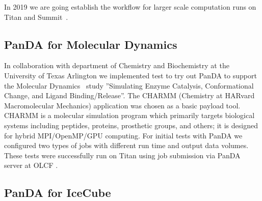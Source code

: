 \documentclass{webofc}
\begin{document}
In 2019 we are going establish the workflow for larger scale computation runs on Titan and Summit~\cite{Summit}.

\subsection{PanDA for Molecular Dynamics} \label{section_moldyn}

In collaboration with department of Chemistry and Biochemistry at the University of Texas Arlington we implemented test to try out PanDA to support the Molecular Dynamics~\cite{3b6dad414e794d36954333f8f177f47c} study ''Simulating Enzyme Catalysis, Conformational Change, and Ligand Binding/Release''. 
The CHARMM (Chemistry at HARvard Macromolecular Mechanics) application was chosen as a basic payload tool. 
CHARMM is a molecular simulation program which primarily targets biological systems including peptides, proteins, prosthetic groups, and others; it is designed for hybrid MPI/OpenMP/GPU computing.
For initial tests with PanDA we configured two types of jobs with different run time and output data volumes. 
These tests were successfully run on Titan using job submission via PanDA server at OLCF .


\subsection{PanDA for IceCube} \label{section_icecube}
\end{document}
